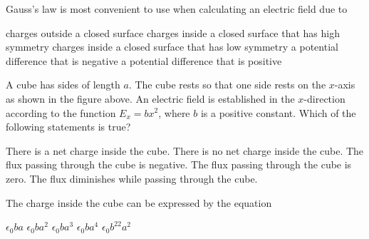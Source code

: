 \documentclass{../../../oss-apphys-exam}
\begin{document}
\begin{questions}
    \question Gauss's law is most convenient to use when calculating an electric
    field due to
    \begin{choices}
      \choice charges outside a closed surface
      \choice charges inside a closed surface that has high symmetry
      \choice charges inside a closed surface that has low symmetry
      \choice a potential difference that is negative
      \choice a potential difference that is positive
    \end{choices}
    
  \question A cube has sides of length $a$. The cube rests so that one side
  rests on the $x$-axis as shown in the figure above. An electric field is
  established in the $x$-direction according to the function $E_x=bx^2$, where
  $b$ is a positive constant. Which of the following statements is true?
  \label{cube1}
  \begin{choices}
    \choice There is a net charge inside the cube.
    \choice There is no net charge inside the cube.
    \choice The flux passing through the cube is negative.
    \choice The flux passing through the cube is zero.
    \choice The flux diminishes while passing through the cube.
  \end{choices}
    
  \question The charge inside the cube can be expressed by the equation
  \label{cube2}
  \begin{choices}
    \choice $\epsilon_0ba$
    \choice $\epsilon_0ba^2$
    \choice $\epsilon_0ba^3$
    \choice $\epsilon_0ba^4$
    \choice $\epsilon_0b^22a^2$
  \end{choices}
   

\end{questions}
\end{document}
